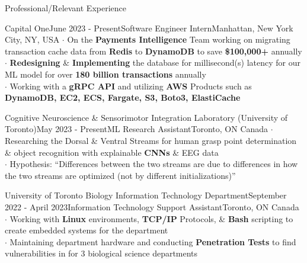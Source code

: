 \documentclass[UTF8]{resume} %
\begin{document}
\begin{rSection}{Professional/Relevant Experience}
\begin{rSubsection}{Capital One}{June 2023 - Present}{Software Engineer Intern}{Manhattan, New York City, NY, USA}
    $\cdot$ On the \textbf{Payments Intelligence} Team working on migrating transaction cache data from \textbf{Redis} to \textbf{DynamoDB} to save \textbf{\$100,000+} annually\\
    $\cdot$ \textbf{Redesigning} \& \textbf{Implementing} the database for millisecond(s) latency for our ML model for over \textbf{180 billion transactions} annually \\
    $\cdot$ Working with a \textbf{gRPC API} and utilizing \textbf{AWS} Products such as \textbf{DynamoDB, EC2, ECS, Fargate, S3, Boto3, ElastiCache} 
\end{rSubsection}
\begin{rSubsection}{Cognitive Neuroscience \& Sensorimotor Integration Laboratory (University of Toronto)}{May 2023 - Present}{ML Research Assistant}{Toronto, ON Canada}
    $\cdot$ Researching the Dorsal \& Ventral Streams for human grasp point determination \& object recognition with explainable \textbf{CNNs} \& EEG data\\
    $\cdot$ Hypothesis: “Differences between the two streams are due to differences in how the two streams are optimized (not by different initializations)”
\end{rSubsection}
\begin{rSubsection}{University of Toronto Biology Information Technology Department}{September 2022 - April 2023}{Information Technology Support Assistant}{Toronto, ON Canada}
    $\cdot$ Working with \textbf{Linux} environments, \textbf{TCP/IP} Protocols, \& \textbf{Bash} scripting to create embedded systems for the department \\
    $\cdot$ Maintaining department hardware and conducting \textbf{Penetration Tests} to find vulnerabilities in for 3 biological science departments
\end{rSubsection}

\end{rSection}
\end{document}
